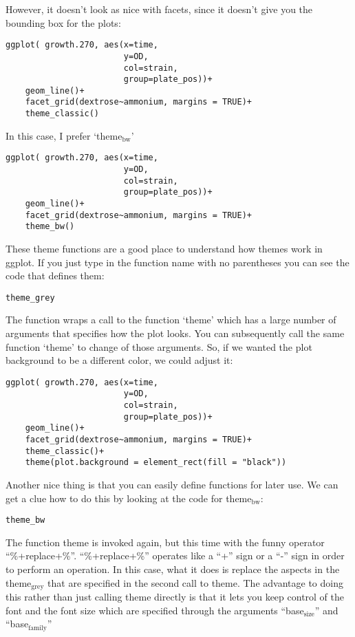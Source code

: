 \documentclass[11pt]{article}
\begin{document}
However, it doesn't look as nice with facets, since it doesn't give
you the bounding box for the plots:

\begin{verbatim}
ggplot( growth.270, aes(x=time,
                        y=OD,
                        col=strain,
                        group=plate_pos))+
    geom_line()+
    facet_grid(dextrose~ammonium, margins = TRUE)+
    theme_classic()
\end{verbatim}


In this case, I prefer `theme$_{\mathrm{bw}}$'

\begin{verbatim}
ggplot( growth.270, aes(x=time,
                        y=OD,
                        col=strain,
                        group=plate_pos))+
    geom_line()+
    facet_grid(dextrose~ammonium, margins = TRUE)+
    theme_bw()
\end{verbatim}


These theme functions are a good place to understand how themes work
in ggplot. If you just type in the function name with no parentheses
you can see the code that defines them:

\begin{verbatim}
theme_grey
\end{verbatim}


The function wraps a call to the function `theme' which has a large
number of arguments that specifies how the plot looks. You can
subsequently call the same function `theme' to change of those
arguments. So, if we wanted the plot background to be a different
color, we could adjust it:

\begin{verbatim}
ggplot( growth.270, aes(x=time,
                        y=OD,
                        col=strain,
                        group=plate_pos))+
    geom_line()+
    facet_grid(dextrose~ammonium, margins = TRUE)+
    theme_classic()+
    theme(plot.background = element_rect(fill = "black"))
\end{verbatim}

Another nice thing is that you can easily define functions for later
use. We can get a clue how to do this by looking at the code for
theme$_{\mathrm{bw}}$:

\begin{verbatim}
theme_bw
\end{verbatim}


The function theme is invoked again, but this time with the funny
operator ``\%+replace+\%''. ``\%+replace+\%'' operates like a ``+'' sign or a
``-'' sign in order to perform an operation. In this case, what it does
is replace the aspects in the theme$_{\mathrm{grey}}$ that are specified in the
second call to theme. The advantage to doing this rather than just
calling theme directly is that it lets you keep control of the font
and the font size which are specified through the arguments
``base$_{\mathrm{size}}$'' and ``base$_{\mathrm{family}}$''
\end{document}
